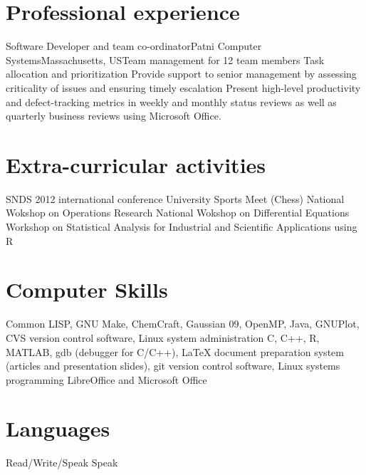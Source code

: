 \documentclass [a4paper,11pt]{moderncv}
\begin{document}
\section{Professional experience}
 {Software Developer and team co-ordinator}{Patni Computer Systems}{Massachusetts, US}{}{Team management for 12 team members \newline{} Task allocation and prioritization \newline{} Provide support to senior management by assessing criticality of issues and ensuring timely escalation \newline{} Present high-level productivity and defect-tracking metrics in weekly and monthly status reviews as well as quarterly business reviews using Microsoft Office.}


\section {Extra-curricular activities}
 {SNDS 2012 international conference}
 {University Sports Meet (Chess)}
 {National Wokshop on Operations Research}
 {National Wokshop on Differential Equations}
 {Workshop on Statistical Analysis for Industrial and Scientific Applications using R}

\section{Computer Skills}
 {Common LISP, GNU Make, ChemCraft, Gaussian 09, OpenMP, Java, GNUPlot, CVS version control software,  Linux system administration}
 {C, C++, R, MATLAB, gdb (debugger for C/C++), \LaTeX \hspace{1pt} document preparation system (articles and presentation slides), git version control software, Linux systems programming}
 {LibreOffice and Microsoft Office}

\section{Languages}
 {Read/Write/Speak}
 {Speak}
\end{document}

